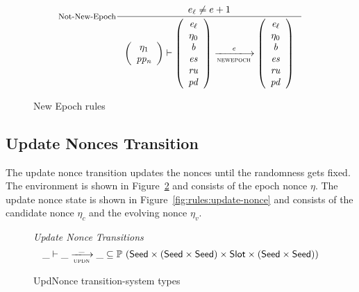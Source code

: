\begin{figure}[ht]
  \nextdef

  \begin{equation}\label{eq:not-new-epoch}
    \inference[Not-New-Epoch]
    {
      e_\ell \neq e + 1
    }
    {
      \left(
        {\begin{array}{c}
            \eta_1 \\
            \var{pp_n} \\
        \end{array}}
      \right)
      \vdash
      {\left(\begin{array}{c}
            \var{e_\ell} \\
            \eta_0 \\
            \var{b} \\
            \var{es} \\
            \var{ru} \\
            \var{pd} \\
      \end{array}\right)}
      \trans{newepoch}{\var{e}}
      {\left(\begin{array}{c}
            \var{e_\ell} \\
            \eta_0 \\
            \var{b} \\
            \var{es} \\
            \var{ru} \\
            \var{pd} \\
      \end{array}\right)}
    }
  \end{equation}
  \caption{New Epoch rules}
  \label{fig:rules:not-new-epoch}
\end{figure}

\subsection{Update Nonces Transition}
\label{sec:update-nonces-trans}

The update nonce transition updates the nonces until the randomness gets
fixed. The environment is shown in Figure~\ref{fig:ts-types:updnonce} and
consists of the epoch nonce $\eta$. The update nonce state is shown in
Figure~\ref{fig:rules:update-nonce} and consists of the candidate nonce
$\eta_c$ and the evolving nonce $\eta_v$.

\begin{figure}
  \emph{Update Nonce Transitions}
  \begin{equation*}
    \_ \vdash \var{\_} \trans{updn}{\_} \var{\_} \subseteq
    \powerset (\Seed \times (\Seed\times\Seed) \times \Slot \times (\Seed\times\Seed))
  \end{equation*}
  \caption{UpdNonce transition-system types}
  \label{fig:ts-types:updnonce}
\end{figure}

